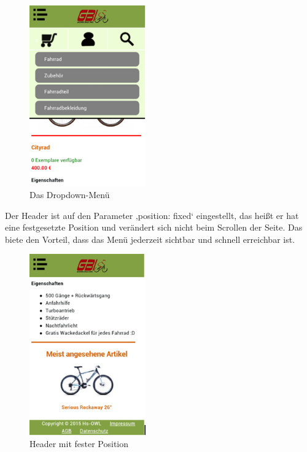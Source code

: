 \begin{figure}[H]
\begin{center}
\includegraphics[width=5cm]{Bilder/Michael_Abbildung5-DasDropDownMenue.png}
\end{center}
\caption{Das Dropdown-Menü}
\end{figure}

Der Header ist auf den Parameter ‚position: fixed‘ eingestellt, das heißt er hat eine festgesetzte Position und verändert sich nicht beim Scrollen der Seite. Das biete den Vorteil, dass das Menü jederzeit sichtbar und schnell erreichbar ist.

\begin{figure}[H]
\begin{center}
\includegraphics[width=5cm]{Bilder/Michael_Abbildung6-HeaderMitFesterPosition.png}
\end{center}
\caption{Header mit fester Position}
\end{figure}

